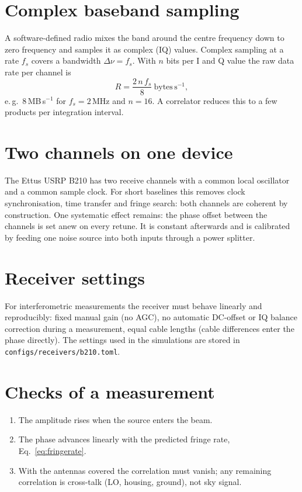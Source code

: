 
\section{Complex baseband sampling}

A software-defined radio mixes the band around the centre frequency
down to zero frequency and samples it as complex (IQ) values. Complex
sampling at a rate $f_s$ covers a bandwidth $\Delta\nu = f_s$. With
$n$ bits per I and Q value the raw data rate per channel is
\begin{equation}
  R = \frac{2\,n\,f_s}{8}\ \mathrm{bytes\,s^{-1}},
\end{equation}
e.\,g.\ 8\,MB\,s$^{-1}$ for $f_s = 2\,\mathrm{MHz}$ and $n=16$. A
correlator reduces this to a few products per integration interval.

\section{Two channels on one device}

The Ettus USRP B210 has two receive channels with a common local
oscillator and a common sample clock. For short baselines this removes
clock synchronisation, time transfer and fringe search: both channels
are coherent by construction. One systematic effect remains: the phase
offset between the channels is set anew on every retune. It is constant
afterwards and is calibrated by feeding one noise source into both
inputs through a power splitter.

\section{Receiver settings}

For interferometric measurements the receiver must behave linearly and
reproducibly: fixed manual gain (no AGC), no automatic DC-offset or IQ
balance correction during a measurement, equal cable lengths (cable
differences enter the phase directly). The settings used in the
simulations are stored in \texttt{configs/receivers/b210.toml}.

\section{Checks of a measurement}

\begin{enumerate}
  \item The amplitude rises when the source enters the beam.
  \item The phase advances linearly with the predicted fringe rate,
        Eq.~\eqref{eq:fringerate}.
  \item With the antennas covered the correlation must vanish; any
        remaining correlation is cross-talk (LO, housing, ground), not
        sky signal.
\end{enumerate}

